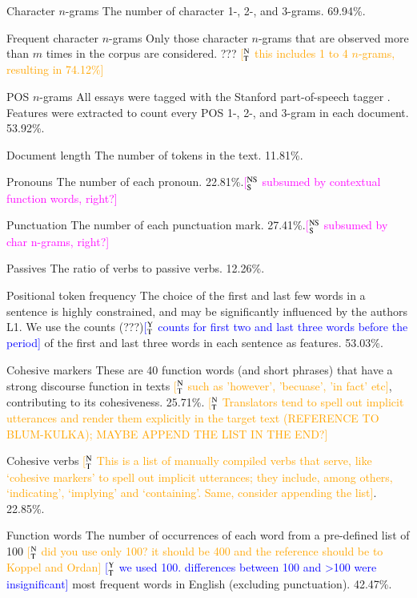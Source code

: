 \documentclass[11pt,letterpaper]{article}
\newcommand{\ensuretext}[1]{#1}
\newcommand{\nssmarker}{\ensuretext{\textcolor{magenta}{\ensuremath{^{\textsc{NS}}_{\textsc{S}}}}}}
\newcommand{\ytmarker}{\ensuretext{\textcolor{blue}{\ensuremath{^{\textsc{Y}}_{\textsc{T}}}}}}
\newcommand{\ntmarker}{\ensuretext{\textcolor{green}{\ensuremath{^{\textsc{N}}_{\textsc{T}}}}}}
\newcommand{\arkcomment}[3]{\ensuretext{\textcolor{#3}{[#1 #2]}}}
\newcommand{\nss}[1]{\arkcomment{\nssmarker}{#1}{magenta}}
\newcommand{\yt}[1]{\arkcomment{\ytmarker}{#1}{blue}}
\newcommand{\nt}[1]{\arkcomment{\ntmarker}{#1}{orange}}
\begin{document}
\begin{compactdesc}
\item[Character $n$-grams] The number of character 1-, 2-, and
  3-grams. 69.94\%.
\item[Frequent character $n$-grams] Only those character $n$-grams
  that are observed more than $m$ times in the corpus are
  considered. ??? \nt{this includes 1 to 4 $n$-grams, resulting in 74.12\%}
\item[POS $n$-grams] All essays were tagged with the Stanford part-of-speech tagger \citep{toutanova-03}.
Features were extracted to count every POS 1-, 2-, and 3-gram in each document. 53.92\%.
\item[Document length] The number of tokens in the text. 11.81\%.
\item[Pronouns] The number of each pronoun. 22.81\%.\nss{subsumed by contextual function words, right?}
\item[Punctuation] The number of each punctuation mark. 27.41\%.\nss{subsumed by char n-grams, right?}
\item[Passives] The ratio of verbs to passive verbs. 12.26\%.
\item[Positional token frequency] The choice of the first and last few
  words in a sentence is highly constrained, and may be significantly
  influenced by the authors L1. We use the counts (???)\yt{counts for first two and last three words before the period} of the first
  and last three words in each sentence as features. 53.03\%.
\item[Cohesive markers] These are 40 function words (and short phrases)
  that have a strong discourse function in texts \nt{such as 'however', 'becuase', 'in fact' etc}, contributing to its
  cohesiveness. 25.71\%. \nt{Translators tend to spell out implicit utterances and render them explicitly in the target text (REFERENCE TO BLUM-KULKA); MAYBE APPEND THE LIST IN THE END?} 
\item[Cohesive verbs] \nt{This is a list of manually compiled verbs that serve, like `cohesive markers' to spell out implicit utterances; they include, among others, `indicating', `implying' and `containing'. Same, consider appending the list}. 22.85\%.
\item[Function words] The number of occurrences of each word from a
  pre-defined list of 100 \nt{did you use only 100? it should be 400 and the reference should be to Koppel and Ordan} \yt{we used 100. differences between 100 and >100 were insignificant} most frequent words in English (excluding
  punctuation). 42.47\%.

\end{compactdesc}
\end{document}
